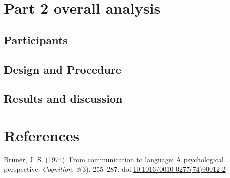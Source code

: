 \documentclass[man]{apa6}
\theoremstyle{definition}
\theoremstyle{definition}
\theoremstyle{definition}
\theoremstyle{remark}
\begin{document}
\section{Part 2 overall analysis}\label{part-2-overall-analysis}

\subsection{Participants}\label{participants-12}

\subsection{Design and Procedure}\label{design-and-procedure-12}

\subsection{Results and discussion}\label{results-and-discussion-12}

\newpage

\section{References}\label{references}

\setlength{\parindent}{-0.5in} \setlength{\leftskip}{0.5in}

\hypertarget{refs}{}
\hypertarget{ref-bruner1974communication}{}
Bruner, J. S. (1974). From communication to language: A psychological
perspective. \emph{Cognition}, \emph{3}(3), 255--287.
doi:\href{https://doi.org/10.1016/0010-0277(74)90012-2}{10.1016/0010-0277(74)90012-2}
\end{document}
